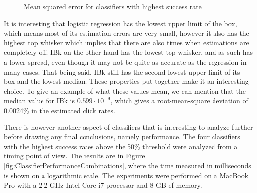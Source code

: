 \documentclass{sig-alternate}
\begin{document}
\begin{figure}[htb]
\begin{center}

	\caption{Mean squared error for classifiers with highest success rate}
	\label{fig:ClassifierMSQE}
\end{center}
\end{figure}

It is interesting that logistic regression has the lowest upper limit of the box, which means most of its estimation errors are very small, however it also has the highest top whisker which implies that there are also times when estimations are completely off. IBk on the other hand has the lowest top whisker, and as such has a lower spread, even though it may not be quite as accurate as the regression in many cases. That being said, IBk still has the second lowest upper limit of its box and the lowest median. These properties put together make it an interesting choice. To give an example of what these values mean, we can mention that the median value for IBk is \(0.599 \cdot 10^{-9}\), which gives a root-mean-square deviation of 0.0024\% in the estimated click rates.

There is however another aspect of classifiers that is interesting to analyze further before drawing any final conclusions, namely performance. The four classifiers with the highest success rates above the 50\% threshold were analyzed from a timing point of view. The results are in Figure \ref{fig:ClassifierPerformanceCombinations}, where the time measured in milliseconds is shown on a logarithmic scale. The experiments were performed on a MacBook Pro with a 2.2 GHz Intel Core i7 processor and 8 GB of memory.
\end{document}
